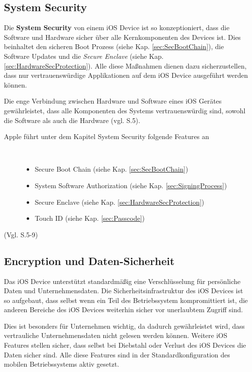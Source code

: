 \subsection{System Security}
\label{sec:SystemSec}
Die \textbf{System Security} von einem iOS Device ist so kon­zep­ti­o­nie­rt, dass die Software und Hardware sicher über alle Kernkomponenten des Devices ist. Dies beinhaltet den sicheren Boot Prozess (siehe Kap. \ref{sec:SecBootChain}), die Software Updates und die \textit{\glqq Secure Enclave\grqq{}} (siehe Kap. \ref{sec:HardwareSecProtection}). Alle diese Maßnahmen dienen dazu sicherzustellen, dass nur vertrauenswürdige Applikationen auf dem iOS Device ausgeführt werden können.\par 

Die enge Verbindung zwischen Hardware und Software eines iOS Gerätes gewährleistet, dass alle Komponenten des Systems vertrauenswürdig sind, sowohl die Software als auch die Hardware (vgl. \cite{Apple[4]} S.5).

\vspace*{1cm}

\begin{description}
\item[Apple führt unter dem Kapitel System Security folgende Features an]~\par
	\begin{itemize}
		\item Secure Boot Chain (siehe Kap. \ref{sec:SecBootChain})
 		\item System Software Authorization (siehe Kap. \ref{sec:SigningProcess})
 		\item Secure Enclave (siehe Kap. \ref{sec:HardwareSecProtection})
 		\item Touch ID (siehe Kap. \ref{sec:Passcode})
        \end{itemize}
\end{description}
(Vgl. \cite{Apple[4]} S.5-9)

\subsection{Encryption und Daten-Sicherheit}
\label{sec:DataEnc}

Das iOS Device unterstützt standardmäßig eine Verschlüsselung für persönliche Daten und Unternehmensdaten. Die Sicherheitsinfrastruktur des iOS Devices ist so aufgebaut, dass selbst wenn ein Teil des Betriebssystem kompromittiert ist, die anderen Bereiche des iOS Devices weiterhin sicher vor unerlaubtem Zugriff sind. \par
Dies ist besonders für Unternehmen wichtig, da dadurch gewährleistet wird, dass vertrauliche Unternehmensdaten nicht gelesen werden können. Weitere iOS Features stellen sicher, dass selbst bei Diebstahl oder Verlust des iOS Devices die Daten sicher sind. Alle diese Features sind in der Standardkonfiguration des mobilen Betriebssystems aktiv gesetzt.

